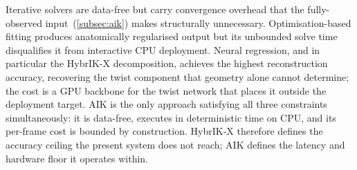 Iterative solvers are data-free but carry convergence overhead that
the fully-observed input~(\autoref{subsec:aik}) makes structurally unnecessary.
Optimisation-based fitting produces anatomically regularised output but
its unbounded solve time disqualifies it from interactive CPU
deployment.
Neural regression, and in particular the HybrIK-X decomposition,
achieves the highest reconstruction accuracy, recovering the twist
component that geometry alone cannot determine; the cost is a GPU
backbone for the twist network that places it outside the deployment
target.
AIK is the only approach satisfying all three constraints
simultaneously: it is data-free, executes in deterministic time on
CPU, and its per-frame cost is bounded by construction.
HybrIK-X therefore defines the accuracy ceiling the present system does
not reach; AIK defines the latency and hardware floor it operates within.
